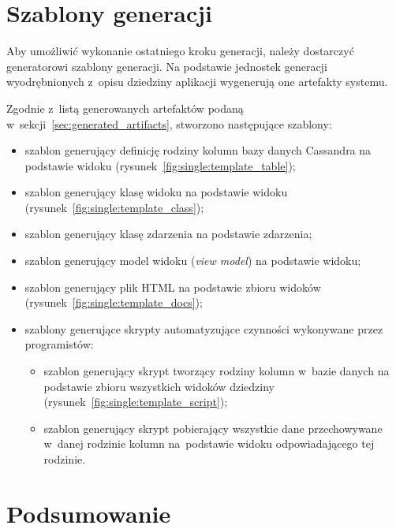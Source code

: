 \section{Szablony generacji}

Aby umożliwić wykonanie ostatniego kroku generacji, należy dostarczyć generatorowi szablony generacji.
Na podstawie jednostek generacji wyodrębnionych z~opisu dziedziny aplikacji wygenerują one artefakty systemu.

Zgodnie z~listą generowanych artefaktów podaną w~sekcji~\ref{sec:generated_artifacts}, stworzono następujące szablony:

\begin{itemize}
 \item szablon generujący definicję rodziny kolumn bazy danych Cassandra na podstawie widoku (rysunek~\ref{fig:single:template_table});
 \item szablon generujący klasę widoku na podstawie widoku (rysunek~\ref{fig:single:template_class});
 \item szablon generujący klasę zdarzenia na podstawie zdarzenia;
 \item szablon generujący model widoku (\emph{view model}) na podstawie widoku;
 \item szablon generujący plik HTML na podstawie zbioru widoków (rysunek~\ref{fig:single:template_docs});
 \item szablony generujące skrypty automatyzujące czynności wykonywane przez programistów:
  \begin{itemize}
   \item szablon generujący skrypt tworzący rodziny kolumn w~bazie danych na podstawie zbioru wszystkich widoków dziedziny (rysunek~\ref{fig:single:template_script});
   \item szablon generujący skrypt pobierający wszystkie dane przechowywane w~danej rodzinie kolumn na~podstawie widoku odpowiadającego tej rodzinie.
  \end{itemize}
\end{itemize}











\section{Podsumowanie}

